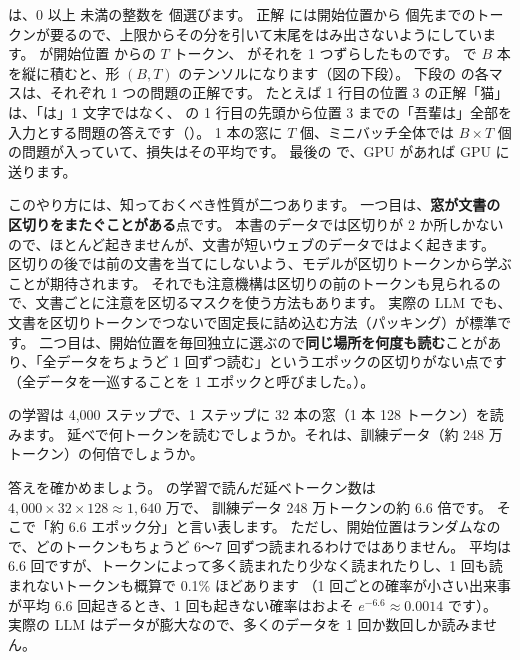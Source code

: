 
 は、0 以上  未満の整数を  個選びます。
正解  には開始位置から  個先までのトークンが要るので、上限からその分を引いて末尾をはみ出さないようにしています。
 が開始位置  からの $T$ トークン、 がそれを 1 つずらしたものです。
 で $B$ 本を縦に積むと、形 $(B, T)$ のテンソルになります（図の下段）。
下段の  の各マスは、それぞれ 1 つの問題の正解です。
たとえば 1 行目の位置 3 の正解「猫」は、「は」1 文字ではなく、 の 1 行目の先頭から位置 3 までの「吾輩は」全部を入力とする問題の答えです（）。
1 本の窓に $T$ 個、ミニバッチ全体では $B\times T$ 個の問題が入っていて、損失はその平均です。
最後の  で、GPU があれば GPU に送ります。

このやり方には、知っておくべき性質が二つあります。
一つ目は、\textbf{窓が文書の区切りをまたぐことがある}点です。
本書のデータでは区切りが 2 か所しかないので、ほとんど起きませんが、文書が短いウェブのデータではよく起きます。
区切りの後では前の文書を当てにしないよう、モデルが区切りトークンから学ぶことが期待されます。
それでも注意機構は区切りの前のトークンも見られるので、文書ごとに注意を区切るマスクを使う方法もあります。
実際の LLM でも、文書を区切りトークンでつないで固定長に詰め込む方法（パッキング）が標準です。
二つ目は、開始位置を毎回独立に選ぶので\textbf{同じ場所を何度も読む}ことがあり、「全データをちょうど 1 回ずつ読む」というエポックの区切りがない点です
（全データを一巡することを 1 エポックと呼びました。）。

\begin{quiz}
 の学習は 4,000 ステップで、1 ステップに 32 本の窓（1 本 128 トークン）を読みます。
延べで何トークンを読むでしょうか。それは、訓練データ（約 248 万トークン）の何倍でしょうか。
\end{quiz}

答えを確かめましょう。
 の学習で読んだ延べトークン数は $4{,}000 \times 32 \times 128 \approx 1{,}640$ 万で、
訓練データ 248 万トークンの約 6.6 倍です。
そこで「約 6.6 エポック分」と言い表します。
ただし、開始位置はランダムなので、どのトークンもちょうど 6〜7 回ずつ読まれるわけではありません。
平均は 6.6 回ですが、トークンによって多く読まれたり少なく読まれたりし、1 回も読まれないトークンも概算で 0.1\% ほどあります
（1 回ごとの確率が小さい出来事が平均 6.6 回起きるとき、1 回も起きない確率はおよそ $e^{-6.6}\approx0.0014$ です）。
実際の LLM はデータが膨大なので、多くのデータを 1 回か数回しか読みません。

